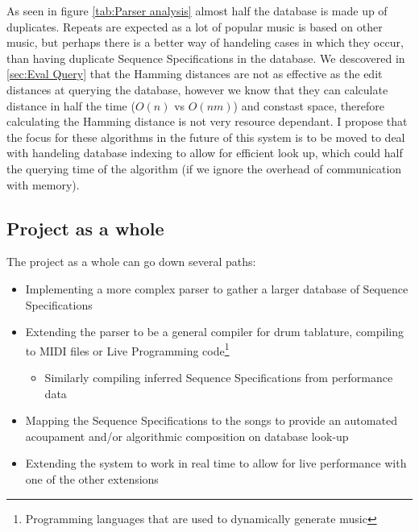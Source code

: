 \documentclass[12pt,twoside,notitlepage]{report}
\begin{document}
		As seen in figure \ref{tab:Parser analysis} almost half the database is made up of duplicates. Repeats are expected as a lot of popular music is based on other music, but perhaps there is a better way of handeling cases in which they occur, than having duplicate Sequence Specifications in the database. We descovered in \ref{sec:Eval Query} that the Hamming distances are not as effective as the edit distances at querying the database, however we know that they can calculate distance in half the time ($O(n)$ vs $O(nm)$) and constast space, therefore calculating the Hamming distance is not very resource dependant. I propose that the focus for these algorithms in the future of this system is to be moved to deal with handeling database indexing to allow for efficient look up, which could half the querying time of the algorithm (if we ignore the overhead of communication with memory).
		
		\subsection{Project as a whole}
		
		The project as a whole can go down several paths:
			\begin{itemize}
				\item{Implementing a more complex parser to gather a larger database of Sequence Specifications}
				\item{Extending the parser to be a general compiler for drum tablature, compiling to MIDI files or Live Programming code\footnote{Programming languages that are used to dynamically generate music}}
				\begin{itemize}
				\item{Similarly compiling inferred Sequence Specifications from performance data}
				\end{itemize}
				\item{Mapping the Sequence Specifications to the songs to provide an automated acoupament and/or algorithmic composition on database look-up}
				\item{Extending the system to work in real time to allow for live performance with one of the other extensions}
\end{itemize}			 

	

\cleardoublepage

\end{document}
